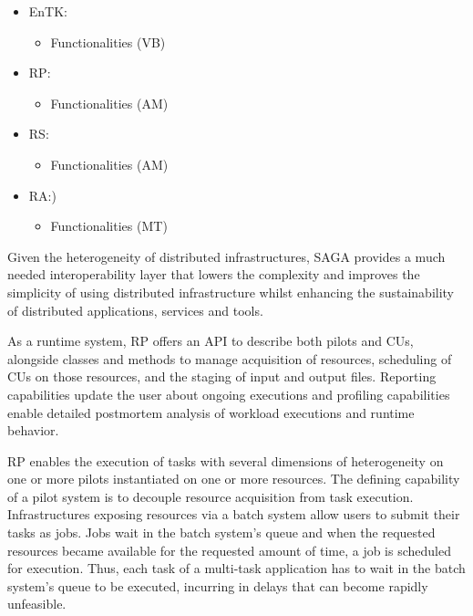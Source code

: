 \documentclass[preprint,12pt, a4paper]{elsarticle}
\begin{document}
\begin{itemize}
  \item EnTK\@:
  \begin{itemize}
    \item Functionalities (VB)
  \end{itemize}
  \item RP\@: 
  \begin{itemize}
    \item Functionalities (AM)
  \end{itemize}
  \item RS\@:
  \begin{itemize}
    \item Functionalities (AM)
  \end{itemize}
  \item RA\@:)
  \begin{itemize}
    \item Functionalities (MT)
  \end{itemize}
\end{itemize}

Given the heterogeneity of distributed infrastructures, SAGA provides a much
needed interoperability layer that lowers the complexity and improves the
simplicity of using distributed infrastructure whilst enhancing the
sustainability of distributed applications, services and
tools.

As a runtime system, RP offers an API to describe both pilots and CUs,
alongside classes and methods to manage acquisition of resources, scheduling
of CUs on those resources, and the staging of input and output files.
Reporting capabilities update the user about ongoing executions and profiling
capabilities enable detailed postmortem analysis of workload executions and
runtime behavior.

RP enables the execution of tasks with several dimensions of heterogeneity on
one or more pilots instantiated on one or more resources. The defining
capability of a pilot system is to decouple resource acquisition from task
execution. Infrastructures exposing resources via a batch system allow users
to submit their tasks as jobs. Jobs wait in the batch system's queue and when
the requested resources became available for the requested amount of time, a
job is scheduled for execution. Thus, each task of a multi-task application
has to wait in the batch system's queue to be executed, incurring in delays
that can become rapidly unfeasible.
\end{document}
